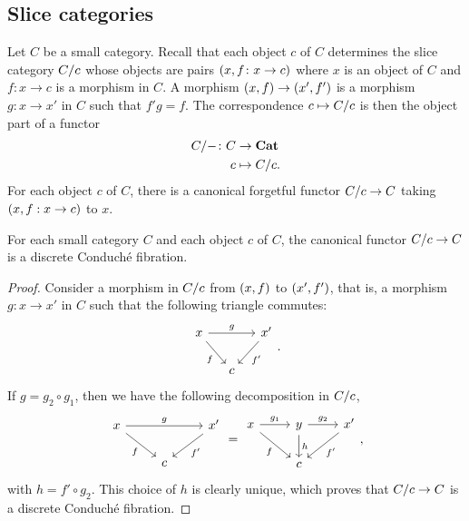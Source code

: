 \subsection{Slice categories}\label{subsection:slice_cat}
\begin{paragr}\label{paragr:slice_cat}
  Let $C$ be a small category. Recall that each object $c$ of $C$
  determines the slice category $C/c$ whose objects are pairs
  $(x,f\colon x \to c)$ where $x$ is an object of $C$ and $f:x\to c$ is
  a morphism in $C$. A morphism $(x,f)\to (x',f')$ is a
  morphism $g:x\to x'$ in $C$ such that $f'g=f$. The correspondence
  $c\mapsto C/c$ is then the object part of a functor
\[
    \begin{aligned}
      C/- \colon C &\to \mathbf{Cat} \\
      c &\mapsto C/c.
    \end{aligned}
  \]
  For each object $c$ of $C$, there is a canonical forgetful functor
  $C/c\to C$
  taking $(x,f:x\to c)$ to $x$.
\end{paragr}

\begin{lemma}\label{lemma:slicescond}
  For each small category $C$ and each object $c$ of $C$, the canonical functor
 $C/c\to C$
  is a discrete Conduché fibration.
\end{lemma}
\begin{proof}
Consider a morphism in $C/c$ from $(x,f)$ to $(x',f')$, that
is, a morphism $g:x\to x'$ in $C$ such that the following triangle commutes:
\[
    \begin{tikzcd}[column sep=small]
      x \ar[rr,"g"] \ar[dr,"f"'] && x'\ar[dl,"f'"] \\
      &c&
    \end{tikzcd}.
  \]
  If $g=g_2\circ g_1$, then we have the following decomposition in
  $C/c$,
  \[
      \begin{tikzcd}
      x \ar[rr,"g"] \ar[dr,"f"'] && x'\ar[dl,"f'"] \\
      &c&
    \end{tikzcd}
    =
    \begin{tikzcd}
      x \ar[r,"g_1"] \ar[dr,"f"']& y \ar[r,"g_2"] \ar[d,"h"] &
      x' \ar[dl,"f'"] \\
      &c&
    \end{tikzcd},
  \]
  with $h=f'\circ g_2$. This choice of $h$ is clearly unique, which
  proves that $C/c \to C$ is a discrete Conduché fibration.
\end{proof}

